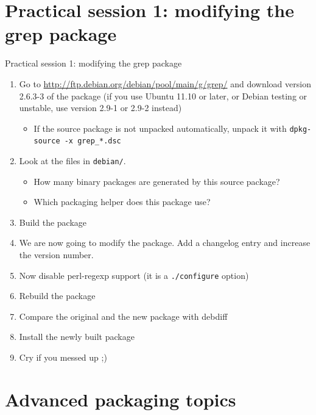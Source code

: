 \documentclass[10pt,final]{beamer}
\begin{document}
\section{Practical session 1: modifying the grep package}
\begin{frame}{Practical session 1: modifying the grep package}
  \begin{enumerate}
  \item Go to \url{http://ftp.debian.org/debian/pool/main/g/grep/} and
    download version 2.6.3-3 of the package (if you use Ubuntu 11.10 or
    later, or Debian testing or unstable, use version 2.9-1 or 2.9-2 instead)
    \begin{itemize}
		   \item If the source package is not unpacked automatically, unpack it with
			   \texttt{dpkg-source~-x~grep\_*.dsc}
    \end{itemize}

  \item Look at the files in \texttt{debian/}.
    \begin{itemize}
    \item 		How many binary packages are generated by this source package?
    \item 		Which packaging helper does this package use?
    \end{itemize}
    \hbr
  \item Build the package
    \hbr
  \item We are now going to modify the package. Add a changelog entry and increase the version number.
    \hbr
  \item Now disable perl-regexp support (it is a \texttt{./configure} option)
    \hbr
  \item Rebuild the package
    \hbr
  \item Compare the original and the new package with debdiff
    \hbr
  \item Install the newly built package
    \hbr
  \item Cry if you messed up ;)
  \end{enumerate}
\end{frame}

\section{Advanced packaging topics}
\end{document}
